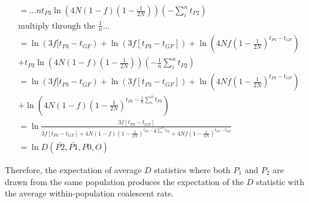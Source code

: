 \documentclass{article}
\begin{document}
{\begin{minipage}{\linewidth}
$$\begin{aligned}
	&= \ldots n t_{P3}\ln \left( 4N(1-f) (1 - \frac{1}{2N}) \right) \left(- \sum^n_i t_{P2} \right) \\
	& \text{multiply through the } \frac{1}{n} \ldots \\
	&= \ln \left( 3f[t_{P3} - t_{GF} \right) + \ln \left( 3f [t_{P3} - t_{GF}] \right) +  \ln \left( 4Nf (1 - \frac{1}{2N})^{t_{P3}-t_{GF}} \right) \\ &+ t_{P3} \ln \left( 4N(1-f) (1 - \frac{1}{2N}) \right) \left(- \frac{1}{n} \sum^n_i t_{P2} \right) \\
	&= \ln \left( 3f[t_{P3} - t_{GF} \right) + \ln \left( 3f [t_{P3} - t_{GF}] \right) +  \ln \left( 4Nf (1 - \frac{1}{2N})^{t_{P3}-t_{GF}} \right) \\ &+ \ln \left( 4N(1-f) (1 - \frac{1}{2N})^{t_{P3} - \frac{1}{n} \sum^n_i t_{P2}} \right) \\
	&= \ln \frac{3f[t_{P3} - t_{GF}]}{3f [t_{P3} - t_{GF}] + 4N(1-f) (1 - \frac{1}{2N})^{t_{P3}-  \frac{1}{n} \sum^n_i t_{P2}} + 4Nf (1 - \frac{1}{2N})^{t_{P3}-t_{GF}}} \\
	&= \ln D(\bar{P2}, \bar{P1}, P0, O)
	\end{aligned} $$
\end{minipage}
}

Therefore, the expectation of average $D$ statistics where both $P_1$ and $P_2$ are drawn from the same population produces the expectation of the $D$ statistic with the average within-population coalescent rate. 
\end{document}
